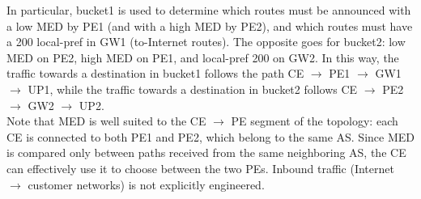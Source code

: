 \documentclass{report}
\begin{document}
In particular, bucket1 is used to determine which routes must be announced with a low MED by PE1 (and with a high MED by PE2), and which routes must have a 200 local-pref in GW1 (to-Internet routes). The opposite goes for bucket2: low MED on PE2, high MED on PE1, and local-pref 200 on GW2. In this way, the traffic towards a destination in bucket1 follows the path CE $\rightarrow$ PE1 $\rightarrow$ GW1 $\rightarrow$ UP1, while the traffic towards a destination in bucket2 follows CE $\rightarrow$ PE2 $\rightarrow$ GW2 $\rightarrow$ UP2.
\\
Note that MED is well suited to the CE $\rightarrow$ PE segment of the topology: each CE is connected to both PE1 and PE2, which belong to the same AS. Since MED is compared only between paths received from the same neighboring AS, the CE can effectively use it to choose between the two PEs. Inbound traffic (Internet $\rightarrow$ customer networks) is not explicitly engineered.
\end{document}
